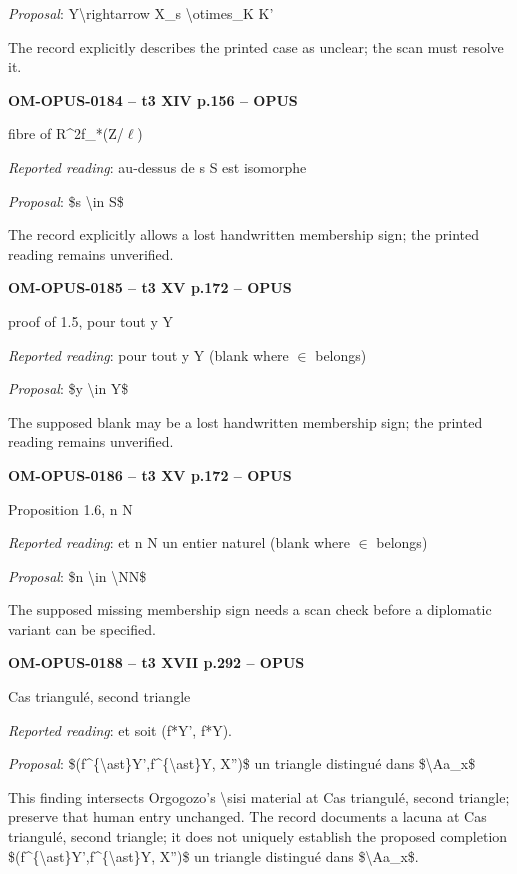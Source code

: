 \emph{Proposal}: Y\textbackslash{}rightarrow X\_s \textbackslash{}otimes\_K K'\par
The record explicitly describes the printed case as unclear; the scan must resolve it.\par
\par\noindent\textbf{OM-OPUS-0184 -- t3 XIV p.156 -- OPUS}\par
fibre of R\textasciicircum{}2f\_*(Z/\ensuremath{\ell})\par
\emph{Reported reading}: au-dessus de s S est isomorphe\par
\emph{Proposal}: \$s \textbackslash{}in S\$\par
The record explicitly allows a lost handwritten membership sign; the printed reading remains unverified.\par
\par\noindent\textbf{OM-OPUS-0185 -- t3 XV p.172 -- OPUS}\par
proof of 1.5, pour tout y Y\par
\emph{Reported reading}: pour tout y Y (blank where \ensuremath{\in} belongs)\par
\emph{Proposal}: \$y \textbackslash{}in Y\$\par
The supposed blank may be a lost handwritten membership sign; the printed reading remains unverified.\par
\par\noindent\textbf{OM-OPUS-0186 -- t3 XV p.172 -- OPUS}\par
Proposition 1.6, n N\par
\emph{Reported reading}: et n N un entier naturel (blank where \ensuremath{\in} belongs)\par
\emph{Proposal}: \$n \textbackslash{}in \textbackslash{}NN\$\par
The supposed missing membership sign needs a scan check before a diplomatic variant can be specified.\par
\par\noindent\textbf{OM-OPUS-0188 -- t3 XVII p.292 -- OPUS}\par
Cas triangulé, second triangle\par
\emph{Reported reading}: et soit (f*Y', f*Y).\par
\emph{Proposal}: \$(f\textasciicircum{}\{\textbackslash{}ast\}Y',f\textasciicircum{}\{\textbackslash{}ast\}Y, X'')\$ un triangle distingué dans \$\textbackslash{}Aa\_x\$\par
This finding intersects Orgogozo's \textbackslash{}sisi material at Cas triangulé, second triangle; preserve that human entry unchanged. The record documents a lacuna at Cas triangulé, second triangle; it does not uniquely establish the proposed completion \$(f\textasciicircum{}\{\textbackslash{}ast\}Y',f\textasciicircum{}\{\textbackslash{}ast\}Y, X'')\$ un triangle distingué dans \$\textbackslash{}Aa\_x\$.\par
